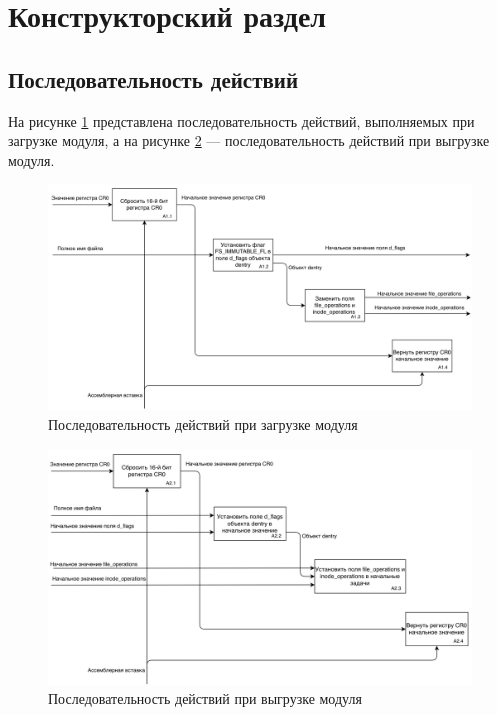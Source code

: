 \section{\large Конструкторский раздел}

\subsection{Последовательность действий}

На рисунке \ref{fig:init-idef0} представлена последовательность действий, выполняемых при загрузке модуля, а на рисунке \ref{fig:exit-idef0} --- последовательность действий при выгрузке модуля.

\begin{figure}[h]
	\centering
	\captionsetup{justification=centering}
	\includegraphics[width=150mm]{img/init_idef0.png}
	\caption{Последовательность действий при загрузке модуля}
	\label{fig:init-idef0}
\end{figure}

\begin{figure}[h]
	\centering
	\captionsetup{justification=centering}
	\includegraphics[width=150mm]{img/exit_idef0.png}
	\caption{Последовательность действий при выгрузке модуля}
	\label{fig:exit-idef0}
\end{figure}

